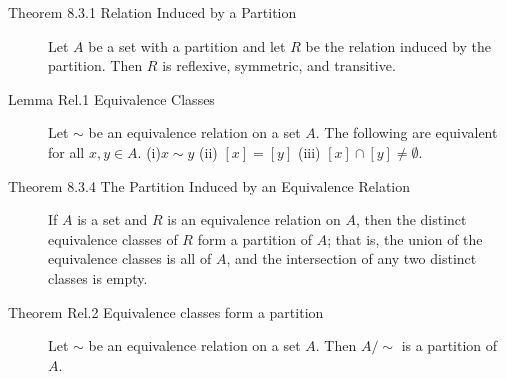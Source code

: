 \documentclass{article}
\begin{document}
\begin{description}
	 \item[Theorem 8.3.1 Relation Induced by a Partition]Let $A$ be a set with a partition and let $R$ be the relation induced by the partition. Then $R$ is reflexive, symmetric, and transitive.
	 \item[Lemma Rel.1 Equivalence Classes]Let $\sim$ be an equivalence relation on a set $A$. The following are equivalent for all $x, y\in A$. (i)$x\sim y$ \qquad (ii) $[x]=[y]$ \qquad (iii) $[x]\cap[y]\neq \emptyset$.
	 \item[Theorem 8.3.4 The Partition Induced by an Equivalence Relation] If $A$ is a set and $R$ is an equivalence relation on $A$, then the distinct equivalence classes of $R$ form a partition of $A$; that is, the union of the equivalence classes is all of $A$, and the intersection of any two distinct classes is empty.
	 \item[Theorem Rel.2 Equivalence classes form a partition]Let $\sim$ be an equivalence relation on a set $A$. Then $A/{\sim}$ is a partition of $A$.
	 

\end{description}
\end{document}
